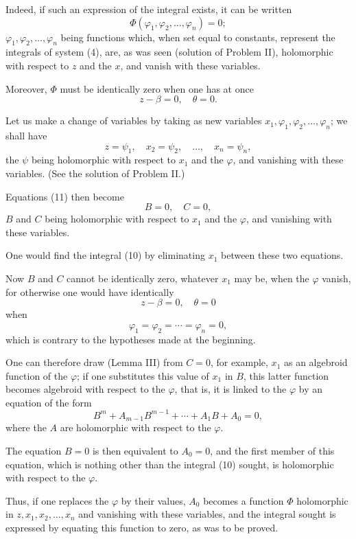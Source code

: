 \documentclass[11pt]{article}
\begin{document}
Indeed, if such an expression of the integral exists, it can be written
\begin{equation*}\tag{10}
\Phi(\varphi_1,\varphi_2,\ldots,\varphi_n)=0;
\end{equation*}
$\varphi_1,\varphi_2,\ldots,\varphi_n$ being functions which, when set equal to constants, represent the integrals of system (4), are, as was seen (solution of Problem II), holomorphic with respect to $z$ and the $x$, and vanish with these variables.

Moreover, $\Phi$ must be identically zero when one has at once
\begin{equation*}\tag{11}
z-\beta=0,\quad \theta=0.
\end{equation*}

Let us make a change of variables by taking as new variables $x_1,\varphi_1,\varphi_2,\ldots,\varphi_n$; we shall have
\begin{equation*}\tag{6}
z=\psi_1,
\quad x_2=\psi_2,
\quad \ldots,
\quad x_n=\psi_n,
\end{equation*}
the $\psi$ being holomorphic with respect to $x_1$ and the $\varphi$, and vanishing with these variables. (See the solution of Problem II.)

Equations (11) then become
\[
B=0,\quad C=0,
\]
$B$ and $C$ being holomorphic with respect to $x_1$ and the $\varphi$, and vanishing with these variables.

One would find the integral (10) by eliminating $x_1$ between these two equations.

Now $B$ and $C$ cannot be identically zero, whatever $x_1$ may be, when the $\varphi$ vanish, for otherwise one would have identically
\[
z-\beta=0,\quad \theta=0
\]
when
\[
\varphi_1=\varphi_2=\cdots=\varphi_n=0,
\]
which is contrary to the hypotheses made at the beginning.

One can therefore draw (Lemma III) from $C=0$, for example, $x_1$ as an algebroid function of the $\varphi$; if one substitutes this value of $x_1$ in $B$, this latter function becomes algebroid with respect to the $\varphi$, that is, it is linked to the $\varphi$ by an equation of the form
\[
B^m+A_{m-1}B^{m-1}+\cdots+A_1B+A_0=0,
\]
where the $A$ are holomorphic with respect to the $\varphi$.

The equation $B=0$ is then equivalent to $A_0=0$, and the first member of this equation, which is nothing other than the integral (10) sought, is holomorphic with respect to the $\varphi$.

Thus, if one replaces the $\varphi$ by their values, $A_0$ becomes a function $\Phi$ holomorphic in $z,x_1,x_2,\ldots,x_n$ and vanishing with these variables, and the integral sought is expressed by equating this function to zero, as was to be proved.
\end{document}
